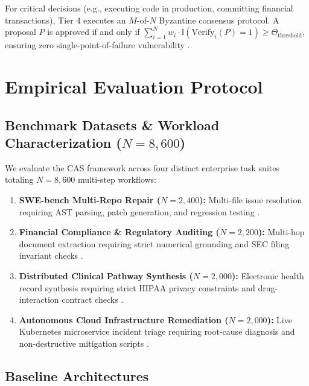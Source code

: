 \documentclass[10pt,twocolumn,letterpaper]{article}
\begin{document}
For critical decisions (e.g., executing code in production, committing financial transactions), Tier 4 executes an $M$-of-$N$ Byzantine consensus protocol. A proposal $P$ is approved if and only if $\sum_{i=1}^N w_i \cdot \mathbb{I}(\text{Verify}_i(P) = 1) \ge \Theta_{\text{threshold}}$, ensuring zero single-point-of-failure vulnerability \cite{crossref_10_1109_access_2026_3656309}.




\section{Empirical Evaluation Protocol}



\subsection{Benchmark Datasets \& Workload Characterization ($N = 8,600$)}


We evaluate the CAS framework across four distinct enterprise task suites totaling $N = 8,600$ multi-step workflows:
\begin{enumerate}
  \item \textbf{SWE-bench Multi-Repo Repair ($N = 2,400$):} Multi-file issue resolution requiring AST parsing, patch generation, and regression testing \cite{arxiv_2405_01543}.
  \item \textbf{Financial Compliance \& Regulatory Auditing ($N = 2,200$):} Multi-hop document extraction requiring strict numerical grounding and SEC filing invariant checks \cite{arxiv_2501_02497}.
  \item \textbf{Distributed Clinical Pathway Synthesis ($N = 2,000$):} Electronic health record synthesis requiring strict HIPAA privacy constraints and drug-interaction contract checks \cite{crossref_10_1201_9788743808145_14}.
  \item \textbf{Autonomous Cloud Infrastructure Remediation ($N = 2,000$):} Live Kubernetes microservice incident triage requiring root-cause diagnosis and non-destructive mitigation scripts \cite{arxiv_2406_00584}.
\end{enumerate}


\subsection{Baseline Architectures}
\end{document}
